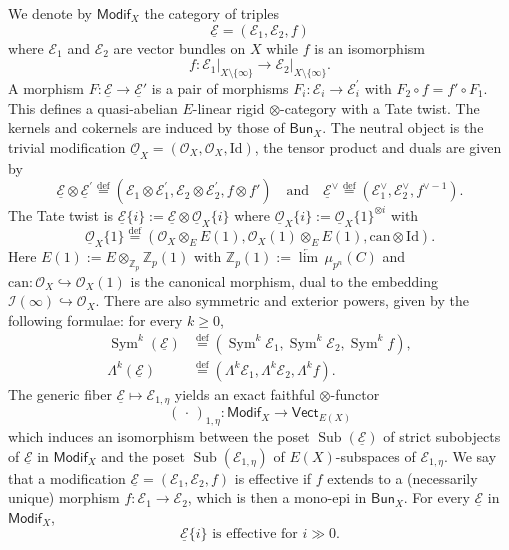 \documentclass[11pt]{article}
\theoremstyle{definition}
\numberwithin{equation}{section}
\numberwithin{figure}{section}
\numberwithin{table}{section}
\newcommand{\Vect}{\mathsf{Vect}}
\newcommand{\Modif}{\mathsf{Modif}}
\newcommand{\Bun}{\mathsf{Bun}}
\DeclareMathOperator{\Sub}{Sub}
\DeclareMathOperator{\Sym}{Sym}
\newcommand{\eqd}{\stackrel{\mathrm{def}}{=}}
\begin{document}
We denote by $\Modif_{X}$ the category of triples
\[
\underline{\mathcal{E}}=(\mathcal{E}_{1},\mathcal{E}_{2},f)
\]
where $\mathcal{E}_{1}$ and $\mathcal{E}_{2}$ are vector bundles on $X$ while $f$ is an isomorphism
\[
f:\mathcal{E}_{1}\vert_{X\setminus\{\infty\}}\rightarrow\mathcal{E}_{2}\vert_{X\setminus\{\infty\}}.
\]
A morphism $F:\underline{\mathcal{E}}\rightarrow\underline{\mathcal{E}}'$ is a pair of morphisms $F_{i}:\mathcal{E}_{i}\rightarrow\mathcal{E}_{i}^{\prime}$ with $F_{2}\circ f=f'\circ F_{1}$. This defines a quasi-abelian $E$-linear rigid $\otimes$-category with a Tate twist. The kernels and cokernels are induced by those of $\Bun_{X}$. The neutral object is the trivial modification $\underline{\mathcal{O}}_{X}=(\mathcal{O}_{X},\mathcal{O}_{X},\mathrm{Id})$, the tensor product and duals are given by
\[
\underline{\mathcal{E}}\otimes\underline{\mathcal{E}}^{\prime}\eqd(\mathcal{E}_{1}\otimes\mathcal{E}_{1}^{\prime},\mathcal{E}_{2}\otimes\mathcal{E}_{2}^{\prime},f\otimes f')\quad\text{and}\quad\underline{\mathcal{E}}^{\vee}\eqd(\mathcal{E}_{1}^{\vee},\mathcal{E}_{2}^{\vee},f^{\vee-1}).
\]
The Tate twist is $\underline{\mathcal{E}}\{i\}:=\underline{\mathcal{E}}\otimes\underline{\mathcal{O}}_{X}\{i\}$ where $\underline{\mathcal{O}}_{X}\{i\}:=\underline{\mathcal{O}}_{X}\{1\}^{\otimes i}$ with
\[
\underline{\mathcal{O}}_{X}\{1\}\eqd\left(\mathcal{O}_{X}\otimes_{E}E(1),\mathcal{O}_{X}(1)\otimes_{E}E(1),\mathrm{can}\otimes\mathrm{Id}\right).
\]
Here $E(1):=E\otimes_{\mathbb{Z}_{p}}\mathbb{Z}_{p}(1)$ with $\mathbb{Z}_{p}(1):=\underleftarrow{\lim}\,\mu_{p^{n}}(C)$ and $\mathrm{can}:\mathcal{O}_{X}\hookrightarrow\mathcal{O}_{X}(1)$ is the canonical morphism, dual to the embedding $\mathcal{I}(\infty)\hookrightarrow\mathcal{O}_{X}$. There are also symmetric and exterior powers, given by the following formulae: for every $k\geq0$,
\begin{align*}
\Sym^{k}(\underline{\mathcal{E}}) & \eqd (\Sym^{k}\mathcal{E}_{1},\Sym^{k}\mathcal{E}_{2},\Sym^{k}f),\\
\Lambda^{k}(\underline{\mathcal{E}}) & \eqd (\Lambda^{k}\mathcal{E}_{1},\Lambda^{k}\mathcal{E}_{2},\Lambda^{k}f).
\end{align*}
The generic fiber $\underline{\mathcal{E}}\mapsto\mathcal{E}_{1,\eta}$ yields an exact faithful $\otimes$-functor
\[
({\,\cdot\,})_{1,\eta}:\Modif_{X}\rightarrow\Vect_{E(X)}
\]
which induces an isomorphism between the poset $\Sub(\underline{\mathcal{E}})$ of strict subobjects of $\underline{\mathcal{E}}$ in $\Modif_{X}$ and the poset $\Sub(\mathcal{E}_{1,\eta})$ of $E(X)$-subspaces of $\mathcal{E}_{1,\eta}$. We say that a modification $\underline{\mathcal{E}}=(\mathcal{E}_{1},\mathcal{E}_{2},f)$ is effective if $f$ extends to a (necessarily unique) morphism $f:\mathcal{E}_{1}\rightarrow\mathcal{E}_{2}$, which is then a mono-epi in $\Bun_{X}$. For every $\underline{\mathcal{E}}$ in $\Modif_{X}$,
\[
\underline{\mathcal{E}}\{i\}\text{ is effective for }i\gg0.
\]
\end{document}
